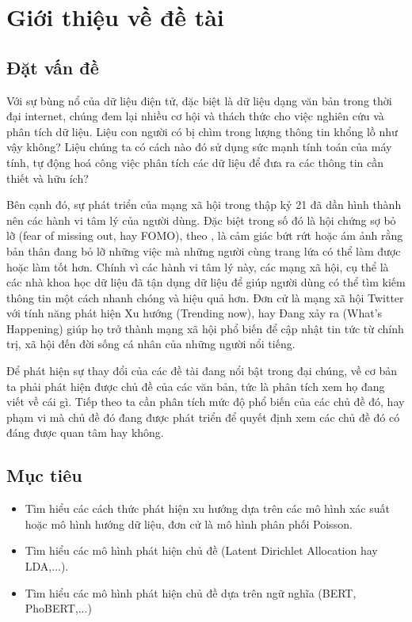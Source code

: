\documentclass[11pt, a4paper]{article}
\begin{document}
\newpage
\tableofcontents
\newpage

\section{Giới thiệu về đề tài}
\label{sec:introduction}

\subsection{Đặt vấn đề}
Với sự bùng nổ của dữ liệu điện tử, đặc biệt là dữ liệu dạng văn bản trong thời đại internet, chúng
đem lại nhiều cơ hội và thách thức cho việc nghiên cứu và phân tích dữ liệu. Liệu con người có bị
chìm trong lượng thông tin khổng lồ như vậy không? Liệu chúng ta có cách nào đó sử dụng sức mạnh
tính toán của máy tính, tự động hoá công việc phân tích các dữ liệu để đưa ra các thông tin cần
thiết và hữu ích?

Bên cạnh đó, sự phát triển của mạng xã hội trong thập kỷ 21 đã dần hình thành nên các hành vi tâm
lý của người dùng. Đặc biệt trong số đó là hội chứng sợ bỏ lỡ (fear of missing out, hay FOMO), theo
\cite{jwtintelligence_fear_2015}, là cảm giác bứt rứt hoặc ám ảnh rằng bản thân đang bỏ lỡ những
việc mà những người cùng trang lứa có thể làm được hoặc làm tốt hơn. Chính vì các hành vi tâm lý
này, các mạng xã hội, cụ thể là các nhà khoa học dữ liệu đã tận dụng dữ liệu để giúp người dùng có
thể tìm kiếm thông tin một cách nhanh chóng và hiệu quả hơn. Đơn cử là mạng xã hội Twitter với
tính năng phát hiện Xu hướng (Trending now), hay Đang xảy ra (What's Happening) giúp họ trở thành
mạng xã hội phổ biến để cập nhật tin tức từ chính trị, xã hội đến đời sống cá nhân của những người
nổi tiếng.

Để phát hiện sự thay đổi của các đề tài đang nổi bật trong đại chúng, về cơ bản ta phải phát hiện
được chủ đề của các văn bản, tức là phân tích xem họ đang viết về cái gì. Tiếp theo ta cần phân
tích mức độ phổ biến của các chủ đề đó, hay phạm vi mà chủ đề đó đang được phát triển để quyết định
xem các chủ đề đó có đáng được quan tâm hay không.

\subsection{Mục tiêu}
\begin{itemize}
	\item Tìm hiểu các cách thức phát hiện xu hướng dựa trên các mô hình xác suất hoặc mô hình
	hướng dữ liệu, đơn cử là mô hình phân phối Poisson.

	\item Tìm hiểu các mô hình phát hiện chủ đề (Latent Dirichlet Allocation hay LDA,...).

	\item Tìm hiểu các mô hình phát hiện chủ đề dựa trên ngữ nghĩa (BERT, PhoBERT,...)
\end{itemize}
\end{document}
